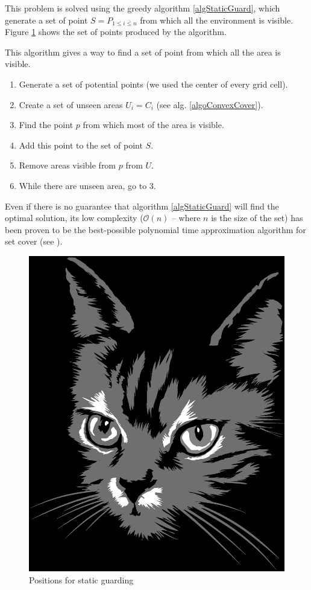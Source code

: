 This problem is solved using the greedy algorithm \ref{algStaticGuard}, which generate a set of point $ S = P_{1\leq i \leq n}$ from which all the environment is visible. Figure \ref{staticCoverSet} shows the set of points produced by the algorithm.

\begin{algorithm}
This algorithm gives a way to find a set of point from which all the area is visible.
\begin{enumerate}
	\item Generate a set of potential points (we used the center of every grid cell).
	\item Create a set of unseen areas $U_i = C_i$ (see alg. \ref{algoConvexCover}).
	\item Find the point $p$ from which most of the area is visible.
	\item Add this point to the set of point $S$.
	\item Remove areas visible from $p$ from $U$.
	\item While there are unseen area, go to 3.
\end{enumerate}
\label{algStaticGuard}
\end{algorithm}

Even if there is no guarantee that algorithm \ref{algStaticGuard} will find the optimal solution, its low complexity ($\mathcal{O}(n)$ -- where $n$ is the size of the set) has been proven to be the best-possible polynomial time approximation algorithm for set cover (see \cite{approxMinProb}).

\begin{figure}[h!t]
	\centering
	\includegraphics[height=0.5\linewidth]{fig/cat.eps}
	\caption{Positions for static guarding}
	\label{staticCoverSet}
\end{figure}